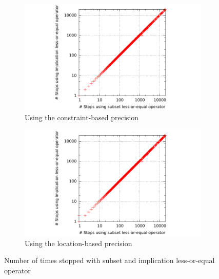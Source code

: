 \begin{figure}
\begin{subfigure}{.48\linewidth}
\includegraphics[trim=2cm 0 1cm 0, clip=true, scale=0.9]{evaluation/sp_leqSub_leqImpl_stops}
\caption{Using the constraint-based precision}
\end{subfigure}%
\hfill
\begin{subfigure}{.48\linewidth}
\includegraphics[trim=2cm 0 1cm 0, clip=true, scale=0.9]{evaluation/sp_leqSub_leqImpl_stopsLocPrec}
\caption{Using the location-based precision}
\end{subfigure}
\caption{Number of times stopped with subset and implication less-or-equal operator}
\label{fig:leqComp:stopAmount}
\end{figure}


